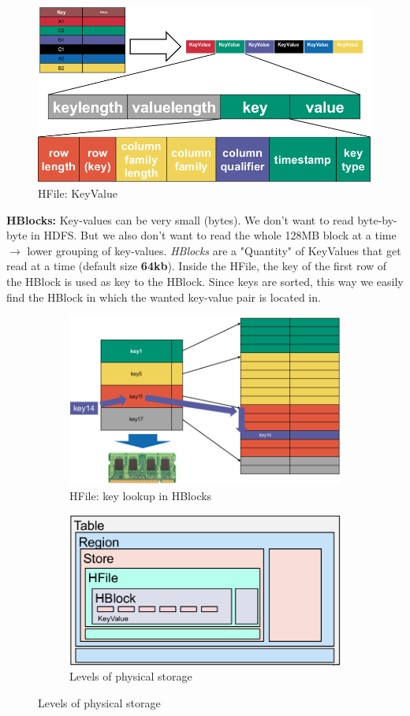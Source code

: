 \documentclass[11pt,oneside,a4paper]{article}
\begin{document}
\begin{figure}[hb!]
	\centering
	\includegraphics[width=0.35\linewidth]{figures/hfile_key_value}
	\caption{HFile: KeyValue}
	\label{fig:hfilekeyvalue}
\end{figure}

\textbf{HBlocks:} Key-values can be very small (bytes). We don't want to read byte-by-byte in HDFS. But we also don't want to read the whole 128MB block at a time $\rightarrow$ lower grouping of key-values. \textit{HBlocks} are a "Quantity" of KeyValues that get read at a time (default size \textbf{64kb}). Inside the HFile, the key of the first row of the HBlock is used as key to the HBlock. Since keys are sorted, this way we easily find the HBlock in which the wanted key-value pair is located in.

\begin{figure}[hb!]
	\centering
	\begin{subfigure}[t]{.5\textwidth}
		\centering
		\includegraphics[width=0.9\linewidth]{figures/hbase_hblock_key_lookup}
		\caption{HFile: key lookup in HBlocks}
		\label{fig:hbasehblockkeylookup}
	\end{subfigure}%
	\begin{subfigure}[t]{.5\textwidth}
		\centering
		\includegraphics[width=1\linewidth]{figures/hbase_levels_of_phys_storage}
		\caption{Levels of physical storage}
		\label{fig:hbaselevelsofphysstorage}
	\end{subfigure}
\end{figure}
\end{document}

